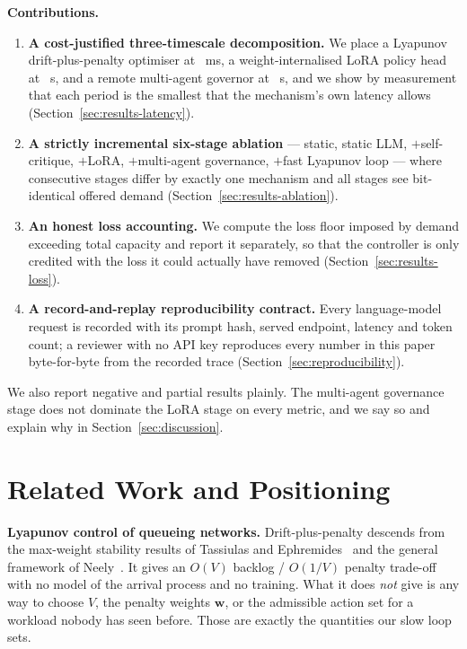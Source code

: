 \documentclass[conference]{IEEEtran}
\newcommand{\wvec}{\mathbf{w}}
\begin{document}
\textbf{Contributions.}
\begin{enumerate}
  \item \textbf{A cost-justified three-timescale decomposition.} We place a
    Lyapunov drift-plus-penalty optimiser at \ResTauMs~ms, a weight-internalised
    LoRA policy head at \ResWindowSec~s, and a remote multi-agent governor at
    \ResEpochSec~s, and we show by measurement that each period is the smallest
    that the mechanism's own latency allows (Section~\ref{sec:results-latency}).
  \item \textbf{A strictly incremental six-stage ablation} --- static,
    static LLM, $+$self-critique, $+$LoRA, $+$multi-agent governance, $+$fast
    Lyapunov loop --- where consecutive stages differ by exactly one mechanism and
    all stages see bit-identical offered demand (Section~\ref{sec:results-ablation}).
  \item \textbf{An honest loss accounting.} We compute the loss floor imposed by
    demand exceeding total capacity and report it separately, so that the
    controller is only credited with the loss it could actually have removed
    (Section~\ref{sec:results-loss}).
  \item \textbf{A record-and-replay reproducibility contract.} Every
    language-model request is recorded with its prompt hash, served endpoint,
    latency and token count; a reviewer with no API key reproduces every number in
    this paper byte-for-byte from the recorded trace
    (Section~\ref{sec:reproducibility}).
\end{enumerate}

We also report negative and partial results plainly. The multi-agent governance
stage does not dominate the LoRA stage on every metric, and we say so and explain
why in Section~\ref{sec:discussion}.

\section{Related Work and Positioning}\label{sec:related}

\textbf{Lyapunov control of queueing networks.} Drift-plus-penalty descends from
the max-weight stability results of Tassiulas and
Ephremides~\cite{tassiulas1992stability} and the general framework of
Neely~\cite{neely2010stochastic}. It gives an $O(V)$ backlog / $O(1/V)$ penalty
trade-off with no model of the arrival process and no training. What it does
\emph{not} give is any way to choose $V$, the penalty weights $\wvec$, or the
admissible action set for a workload nobody has seen before. Those are exactly the
quantities our slow loop sets.
\end{document}
